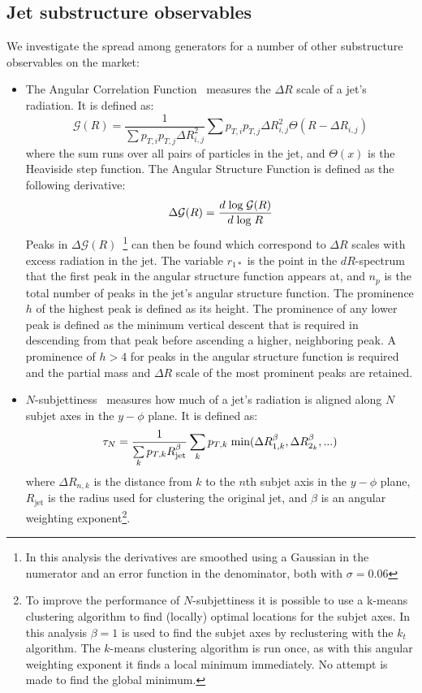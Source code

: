 \subsection{Jet substructure observables}
We investigate the spread among generators for a number of other 
substructure observables on the market:

\begin{itemize}


\item The Angular Correlation Function~\cite{Jankowiak:2011qa}
measures the $\Delta R$ scale of a jet's radiation. It is defined as:
\[ \mathcal{G}(R) = \frac{1}{\sum p_{T,i} p_{T,j} \Delta R_{i,j}^2} \sum p_{T,i} p_{T,j} \Delta R_{i,j}^2 \Theta(R - \Delta R_{i,j}) \]
where the sum runs over all pairs of particles in the jet, 
and $\Theta(x)$ is the Heaviside step function. 
The Angular Structure Function is defined as the following derivative:
\[ \Delta \mathcal{G}(R) = \frac{ d \hspace{0.1cm} \text{log} \hspace{0.1cm} \mathcal{G}(R) }{d \hspace{0.1cm}\text{log} \hspace{0.1cm} R} \]
Peaks in $\Delta \mathcal{G}(R)$~\footnote{
In this analysis the derivatives are smoothed using a 
Gaussian in the numerator and an error function in the denominator, both 
with $\sigma = 0.06$}
can then be found which 
correspond to $\Delta R$ scales with excess radiation in the jet. 
The variable $r_{1*}$ is the point in the $dR$-spectrum that the first peak in the angular structure 
function appears at,  and $n_p$ is the total number of peaks in the jet's angular structure function.
The prominence $h$ of the highest peak is 
defined as its height. The prominence of any lower peak 
is defined as the minimum vertical descent that is required in descending 
from that peak before ascending a higher, neighboring peak.
A prominence of $h > 4$ for peaks in the angular 
structure function is required and the partial mass and $\Delta R$ scale
of the most prominent peaks are retained.


\item $N$-subjettiness~\cite{Thaler:2010tr,Thaler:2011gf} measures how much 
of a jet's radiation is aligned along 
$N$ subjet axes in the $y - \phi$ plane. It is defined as:
\[ \tau_N = \frac{1}{\sum\limits_k p_{T,k} R_{\text{jet}}^\beta } \sum\limits_k p_{T,k} \hspace{0.1cm} \text{min}(\Delta R_{1,k}^\beta, \Delta R_{2_k}^\beta, ...) \]
where $\Delta R_{n,k}$ is the distance from $k$ to the $n$th subjet axis in the $y - \phi$ plane, 
$R_{\text{jet}}$ is the radius used for clustering the original jet, 
and $\beta$ is an angular weighting exponent\footnote{To improve the performance of $N$-subjettiness it is possible to use a k-means clustering 
algorithm to find (locally) optimal locations for the subjet axes. 
In this analysis  $\beta = 1$ is used to find the subjet axes by reclustering with the $k_t$ algorithm.
The $k$-means clustering algorithm is run once,  
as with this angular weighting exponent it finds a local minimum immediately. 
No attempt is made to find the global minimum.}.




\end{itemize}
